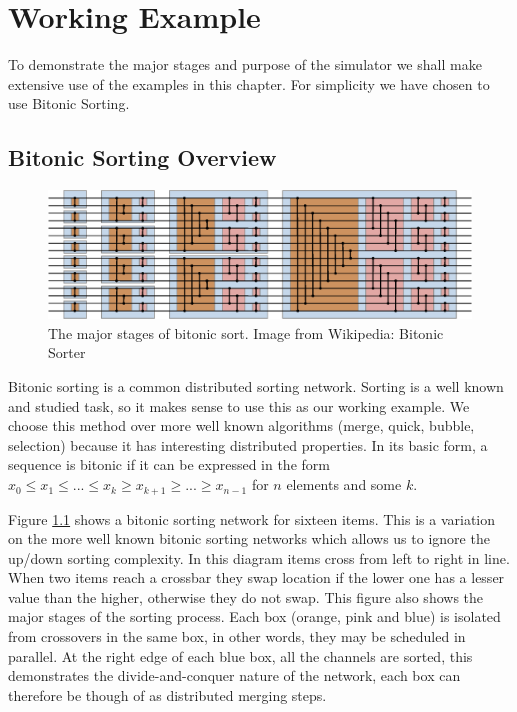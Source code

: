 \chapter{Working Example}

To demonstrate the major stages and purpose of the simulator we shall make extensive use of the examples in this chapter.
For simplicity we have chosen to use Bitonic Sorting.

\section{Bitonic Sorting Overview}

\begin{figure}
\begin{center}
	\includegraphics[width=12cm]{figures/egBitonicSort.eps}
\caption{The major stages of bitonic sort.  Image from Wikipedia: Bitonic Sorter}
\label{figBitonicNormal}
\end{center}
\end{figure}

Bitonic sorting is a common distributed sorting network.
Sorting is a well known and studied task, so it makes sense to use this as our working example.
We choose this method over more well known algorithms (merge, quick, bubble, selection) because it has interesting distributed properties.
In its basic form, a sequence is bitonic if it can be expressed in the form $x_0 \leq x_1 \leq ... \leq x_k \geq x_{k+1} \geq ... \geq x_{n-1}$ for $n$ elements and some $k$.

Figure \ref{figBitonicNormal} shows a bitonic sorting network for sixteen items.
This is a variation on the more well known bitonic sorting networks which allows us to ignore the up/down sorting complexity.
In this diagram items cross from left to right in line.
When two items reach a crossbar they swap location if the lower one has a lesser value than the higher, otherwise they do not swap.
This figure also shows the major stages of the sorting process.
Each box (orange, pink and blue) is isolated from crossovers in the same box, in other words, they may be scheduled in parallel.
At the right edge of each blue box, all the channels are sorted, this demonstrates the divide-and-conquer nature of the network, each box can therefore be though of as distributed merging steps.

